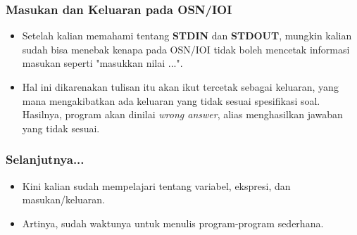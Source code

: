 \begin{frame}
\frametitle{Masukan dan Keluaran pada OSN/IOI}
\begin{itemize}
  \item Setelah kalian memahami tentang \textbf{STDIN} dan \textbf{STDOUT}, mungkin kalian sudah bisa menebak kenapa pada OSN/IOI tidak boleh mencetak informasi masukan seperti "masukkan nilai ...".
  \item Hal ini dikarenakan tulisan itu akan ikut tercetak sebagai keluaran, yang mana mengakibatkan ada keluaran yang tidak sesuai spesifikasi soal. Hasilnya, program akan dinilai \alert{\textit{wrong answer}}, alias menghasilkan jawaban yang tidak sesuai.
\end{itemize}
\end{frame}

\begin{frame}
\frametitle{Selanjutnya...}
\begin{itemize}
  \item Kini kalian sudah mempelajari tentang variabel, ekspresi, dan masukan/keluaran.
  \item Artinya, sudah waktunya untuk menulis program-program sederhana.
\end{itemize}
\end{frame}


